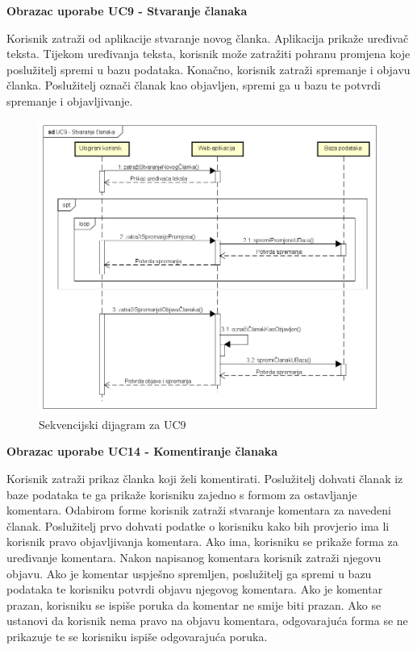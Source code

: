\eject

\textbf{Obrazac uporabe UC9 - Stvaranje članaka}

Korisnik zatraži od aplikacije stvaranje novog članka. Aplikacija prikaže uređivač teksta.
Tijekom uređivanja teksta, korisnik može zatražiti pohranu promjena koje poslužitelj spremi u bazu podataka.
Konačno, korisnik zatraži spremanje i objavu članka. Poslužitelj označi članak kao objavljen, spremi ga u bazu te potvrdi spremanje i objavljivanje.

\begin{figure}[H]
	\includegraphics[scale=0.6]{slike/SekvencijskiDijagramUC9.jpg}
	\centering
	\caption{Sekvencijski dijagram za UC9}
	\label{fig:sekvencijski_dijagram_uc9}
\end{figure}

\eject

\textbf{Obrazac uporabe UC14 - Komentiranje članaka}

Korisnik zatraži prikaz članka koji želi komentirati. Poslužitelj dohvati članak iz baze podataka te ga prikaže korisniku zajedno s formom za ostavljanje
komentara. Odabirom forme korisnik zatraži stvaranje komentara za navedeni članak. Poslužitelj prvo dohvati podatke o korisniku kako bih provjerio ima li korisnik
pravo objavljivanja komentara. Ako ima, korisniku se prikaže forma za uređivanje komentara. Nakon napisanog komentara korisnik zatraži njegovu objavu. Ako je komentar
uspješno spremljen, poslužitelj ga spremi u bazu podataka te korisniku potvrdi objavu njegovog komentara. Ako je komentar prazan, korisniku se ispiše poruka da komentar
ne smije biti prazan. Ako se ustanovi da korisnik nema pravo na objavu komentara, odgovarajuća forma se ne prikazuje te se korisniku ispiše odgovarajuća poruka.

